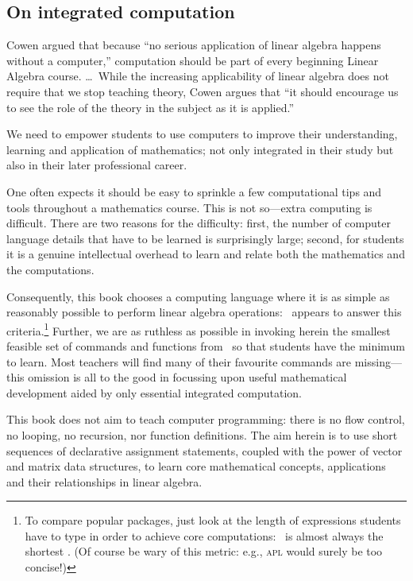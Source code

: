 \subsection*{On integrated computation}

\begin{quoted}{\cite[p.38]{CUPMguide2015}}
Cowen argued that because ``no serious application of linear algebra happens without a computer,'' computation should be part of every beginning Linear Algebra course. \ldots\
While the increasing applicability of linear algebra does not require that we stop teaching theory, Cowen argues that ``it should encourage us to see the role of the theory in the subject as it is applied.''
\end{quoted}


We need to empower students to use computers to improve their understanding, learning and application of mathematics; not only integrated in their study but also in their later professional career.

One often expects it should be easy to sprinkle a few computational tips and tools throughout a mathematics course.
This is not so---extra computing is difficult.
There are two reasons for the difficulty: 
first, the number of computer language details that have to be learned is surprisingly large;
second, for students it is a genuine intellectual overhead to learn and relate both the mathematics and the computations.

Consequently, this book chooses a computing language where it is as simple as reasonably possible to perform linear algebra operations: \script\ appears to answer this criteria.\footnote{To compare popular packages, just look at the length of expressions students have to type in order to achieve core computations: \script\ is almost always the shortest \cite[e.g.]{Nakos1998}.  
(Of course be wary of this metric: e.g., \textsc{apl} would surely be too concise!)}
Further, we are as ruthless as possible in invoking herein the smallest feasible set of commands and functions from \script\ so that  students have the minimum to learn.
Most teachers will find many of their favourite commands are missing---this omission is all to the good in focussing upon useful mathematical development aided by only essential integrated computation.

This book does not aim to teach computer programming: there is no flow control, no looping, no recursion, nor function definitions.
The aim herein is to use short sequences of declarative assignment statements, coupled with the power of vector and matrix data structures, to learn core mathematical concepts, applications and their relationships in linear algebra. 

